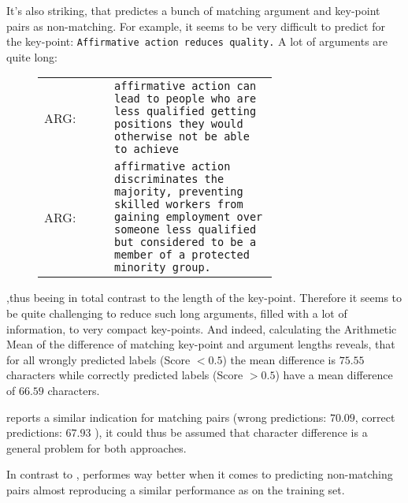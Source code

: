 It's also striking, that \Bert predictes a bunch of matching argument and key-point pairs as non-matching. For example, 
it seems to be very difficult to predict for the key-point: \texttt{Affirmative action reduces quality.} A lot of 
arguments are quite long:\\

\begin{figure}[H]
    \begin{tabularx}{\linewidth}{lp{0.7\linewidth}}
            ARG: & \texttt{affirmative action can lead to people who are less qualified getting positions they would otherwise not be able to achieve}\\
            ARG: & \texttt{affirmative action discriminates the majority, preventing skilled workers from gaining employment over someone less qualified but considered to be a member of a protected minority group.}
    \end{tabularx}
\end{figure}

,thus beeing in total contrast to the length of the key-point. Therefore it seems to be quite challenging to reduce 
such long arguments, filled with a lot of information, to very compact key-points. And indeed, 
calculating the Arithmetic Mean of the difference of matching key-point and argument lengths reveals, that 
for all wrongly predicted labels (Score $< 0.5$) the mean difference is $75.55$ characters while 
correctly predicted labels (Score $> 0.5$) have a mean difference of $66.59$ characters.

\Roberta reports a similar indication for matching pairs (wrong predictions: $70.09$, correct predictions: $67.93$ ), 
it could thus be assumed that character difference is a general problem for both approaches. 

In contrast to \Bert, \Roberta performes way better when it comes to predicting non-matching pairs
almost reproducing a similar performance as on the training set.

